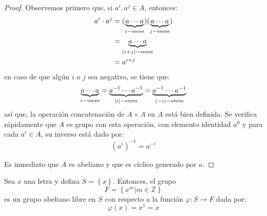 \documentclass[12pt]{report}
\theoremstyle{largebreak}
\newcommand\abs[1]{\ensuremath{\left|#1\right|}}
\newcommand\cf[3]{\ensuremath{#1:#2\rightarrow#3}}
\begin{document}
    \begin{proof}
        Observemos primero que, si $a^i,a^j\in A$, entonces:
        \begin{equation*}
            \begin{split}
                a^i\cdot a^j&=(\underset{i-\textup{veces}}{\underbrace{a\cdots a}})(\underset{j-\textup{veces}}{\underbrace{a\cdots a}})\\
                &=\underset{(i+j)-\textup{veces}}{\underbrace{a\cdots a}}\\
                &=a^{ i+j}\\
            \end{split}
        \end{equation*}
        en caso de que algún $i$ o $j$ sea negativo, se tiene que:
        \begin{equation*}
            \underset{i-\textup{veces}}{\underbrace{a\cdots a}}=\underset{\abs{i}-\textup{veces}}{\underbrace{a^{-1}\cdots a^{-1}}}
            =\underset{(-i)-\textup{veces}}{\underbrace{a^{-1}\cdots a^{-1}}}
        \end{equation*}
        así que, la operación concatenación de $A\times A$ en $A$ está bien definida. Se verifica rápidamente que $A$ es grupo con esta operación, con elemento identidad $a^0$ y para cada $a^i\in A$, su inverso está dado por:
        \begin{equation*}
            (a^i)^{-1}=a^{-i}
        \end{equation*}

        Es inmediato que $A$ es abeliano y que es cíclico generado por $a$.
    \end{proof}

    \begin{propo}
        \label{freeAbelianOneGroup}
        Sea $x$ una letra y defina $S=\left\{x \right\}$. Entonces, el grupo
        \begin{equation*}
            F=\left\{x^m\Big|m\in\mathbb{Z} \right\}
        \end{equation*}
        es un grupo abeliano libre en $S$ con respecto a la función $\cf{\varphi}{S}{F}$ dada por:
        \begin{equation*}
            \varphi(x)=x^1=x
        \end{equation*}
    \end{propo}
\end{document}
